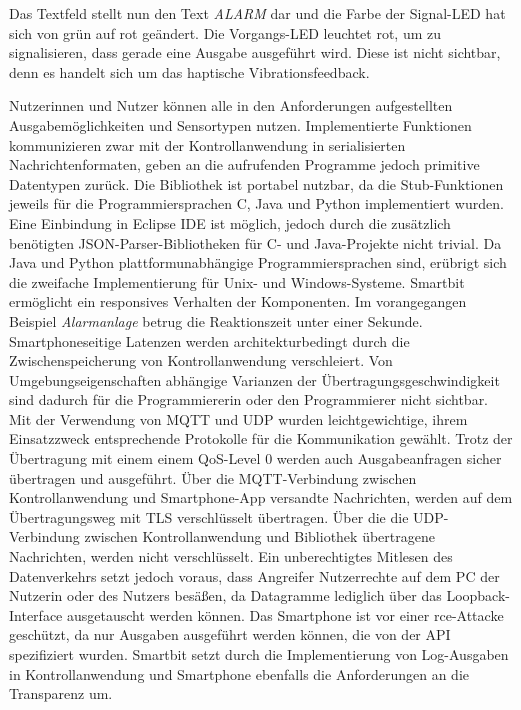 \documentclass[11pt,a4paper]{report}
\begin{document}
Das Textfeld stellt nun den Text \textit{ALARM} dar und die Farbe der Signal-LED hat sich von grün auf rot geändert.
Die Vorgangs-LED leuchtet rot, um zu signalisieren, dass gerade eine Ausgabe ausgeführt wird.
Diese ist nicht sichtbar, denn es handelt sich um das haptische Vibrationsfeedback.

Nutzerinnen und Nutzer können alle in den Anforderungen aufgestellten Ausgabemöglichkeiten und Sensortypen nutzen.
Implementierte Funktionen kommunizieren zwar mit der Kontrollanwendung in serialisierten Nachrichtenformaten, geben an die aufrufenden Programme jedoch primitive Datentypen zurück.
Die Bibliothek ist portabel nutzbar, da die Stub-Funktionen jeweils für die Programmiersprachen C, Java und Python implementiert wurden.
Eine Einbindung in Eclipse IDE ist möglich, jedoch durch die zusätzlich benötigten JSON-Parser-Bibliotheken für C- und Java-Projekte nicht trivial.
Da Java und Python plattformunabhängige Programmiersprachen sind, erübrigt sich die zweifache Implementierung für Unix- und Windows-Systeme.
Smartbit ermöglicht ein responsives Verhalten der Komponenten.
Im vorangegangen Beispiel \textit{Alarmanlage} betrug die Reaktionszeit unter einer Sekunde.
Smartphoneseitige Latenzen werden architekturbedingt durch die Zwischenspeicherung von Kontrollanwendung verschleiert.
Von Umgebungseigenschaften abhängige Varianzen der Übertragungsgeschwindigkeit sind dadurch für die Programmiererin oder den Programmierer nicht sichtbar.
Mit der Verwendung von MQTT und UDP wurden leichtgewichtige, ihrem Einsatzzweck entsprechende Protokolle für die Kommunikation gewählt.
Trotz der Übertragung mit einem einem QoS-Level 0 werden auch Ausgabeanfragen sicher übertragen und ausgeführt.
Über die MQTT-Verbindung zwischen Kontrollanwendung und Smartphone-App versandte Nachrichten, werden auf dem Übertragungsweg mit TLS verschlüsselt übertragen.
Über die die UDP-Verbindung zwischen Kontrollanwendung und Bibliothek übertragene Nachrichten, werden nicht verschlüsselt.
Ein unberechtigtes Mitlesen des Datenverkehrs setzt jedoch voraus, dass Angreifer Nutzerrechte auf dem PC der Nutzerin oder des Nutzers besäßen, da Datagramme lediglich über das Loopback-Interface ausgetauscht werden können.
Das Smartphone ist vor einer \acrfull{rce}-Attacke geschützt, da nur Ausgaben ausgeführt werden können, die von der API spezifiziert wurden.
Smartbit setzt durch die Implementierung von Log-Ausgaben in Kontrollanwendung und Smartphone ebenfalls die Anforderungen an die Transparenz um.
\end{document}
